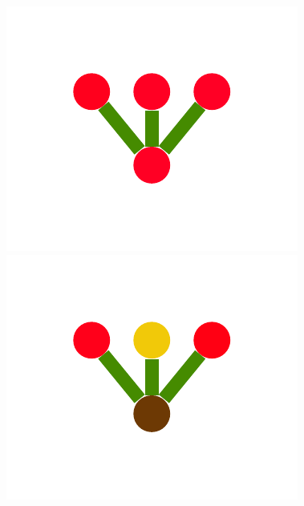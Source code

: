 \documentclass[a4paper,10pt]{article}
\begin{document}
\begin{figure}
{    \includegraphics[scale=.26]{./figures/4-2-2-mergeprog-pre-7.pdf}
    \includegraphics[scale=.26]{./figures/4-2-2-mergeprog-pre-8.pdf}
    \label{fig:merge-orig}
    }
\end{figure}
\end{document}
